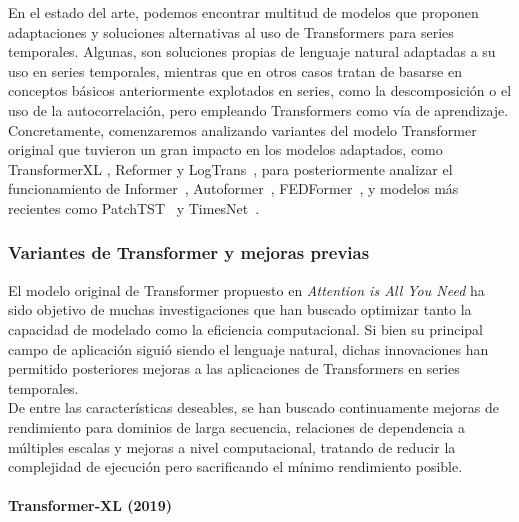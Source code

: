 En el estado del arte, podemos encontrar multitud de modelos que proponen adaptaciones y soluciones alternativas al uso de Transformers para series temporales. Algunas, son soluciones propias de lenguaje natural adaptadas a su uso en series temporales, mientras que en otros casos tratan de basarse en conceptos básicos anteriormente explotados en series, como la descomposición o el uso de la autocorrelación, pero empleando Transformers como vía de aprendizaje.\\

Concretamente, comenzaremos analizando variantes del modelo Transformer original que tuvieron un gran impacto en los modelos adaptados, como TransformerXL \cite{dai2019transformerxlattentivelanguagemodels}, Reformer \cite{kitaev2020reformerefficienttransformer} y LogTrans~\cite{NEURIPS2019_6775a063}, para posteriormente analizar el funcionamiento de Informer~\cite{zhou2021informerefficienttransformerlong}, Autoformer~\cite{wu2022autoformerdecompositiontransformersautocorrelation}, FEDFormer~\cite{zhou2022fedformerfrequencyenhanceddecomposed}, y modelos más recientes como PatchTST~\cite{nie2023timeseriesworth64} y TimesNet~\cite{wu2023timesnettemporal2dvariationmodeling}.

\subsubsection{Variantes de Transformer y mejoras previas}

El modelo original de Transformer propuesto en \textit{Attention is All You Need} \cite{vaswani2023attentionneed} ha sido objetivo de muchas investigaciones que han buscado optimizar tanto la capacidad de modelado como la eficiencia computacional. Si bien su principal campo de aplicación siguió siendo el lenguaje natural, dichas innovaciones han permitido posteriores mejoras a las aplicaciones de Transformers en series temporales.\\

De entre las características deseables, se han buscado continuamente mejoras de rendimiento para dominios de larga secuencia, relaciones de dependencia a múltiples escalas y mejoras a nivel computacional, tratando de reducir la complejidad de ejecución pero sacrificando el mínimo rendimiento posible.

\paragraph{Transformer-XL (2019)}


